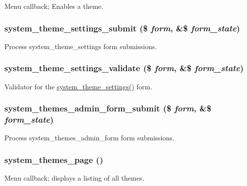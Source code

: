 \label{system_8admin_8inc_ad430bc3a50505142539601f4f7ba25e0}
Menu callback; Enables a theme. \hypertarget{system_8admin_8inc_a5403622cfdf9642a628637c4b4836c72}{
\subsubsection[{system\_\-theme\_\-settings\_\-submit}]{\setlength{\rightskip}{0pt plus 5cm}system\_\-theme\_\-settings\_\-submit (\$ {\em form}, \/  \&\$ {\em form\_\-state})}}
\label{system_8admin_8inc_a5403622cfdf9642a628637c4b4836c72}
Process system\_\-theme\_\-settings form submissions. \hypertarget{system_8admin_8inc_a9e7a668607f5bc611d7daedaa666797e}{
\subsubsection[{system\_\-theme\_\-settings\_\-validate}]{\setlength{\rightskip}{0pt plus 5cm}system\_\-theme\_\-settings\_\-validate (\$ {\em form}, \/  \&\$ {\em form\_\-state})}}
\label{system_8admin_8inc_a9e7a668607f5bc611d7daedaa666797e}
Validator for the \hyperlink{group__forms_ga5b2e00be741c5eae4eb1e56c862a68d5}{system\_\-theme\_\-settings()} form. \hypertarget{system_8admin_8inc_a9076bd2c2f4ed726578e88c4419785fe}{
\subsubsection[{system\_\-themes\_\-admin\_\-form\_\-submit}]{\setlength{\rightskip}{0pt plus 5cm}system\_\-themes\_\-admin\_\-form\_\-submit (\$ {\em form}, \/  \&\$ {\em form\_\-state})}}
\label{system_8admin_8inc_a9076bd2c2f4ed726578e88c4419785fe}
Process system\_\-themes\_\-admin\_\-form form submissions. \hypertarget{system_8admin_8inc_a4e0d7dd2d258e827cc3195b95151cd59}{
\subsubsection[{system\_\-themes\_\-page}]{\setlength{\rightskip}{0pt plus 5cm}system\_\-themes\_\-page ()}}
\label{system_8admin_8inc_a4e0d7dd2d258e827cc3195b95151cd59}
Menu callback; displays a listing of all themes. 